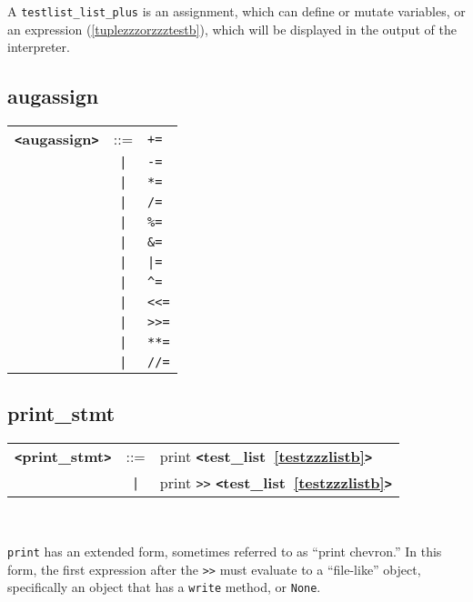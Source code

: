 \documentclass[12pt]{article}
\begin{document}
A \verb|testlist_list_plus| is an assignment, which can define or mutate variables, or an expression (\ref{tuplezzzorzzztestb}), which will be displayed in the output of the interpreter.

\subsection{augassign}
\label{augassignb}
\begin{tabular}{lcl}
{\bf \verb+<+augassign\verb+>+} & ::=  & \verb|+=| \\
 & \verb+|+  & \verb|-=| \\
 & \verb+|+  & \verb|*=| \\
 & \verb+|+  & \verb|/=| \\
 & \verb+|+  & \verb|%=| \\
 & \verb+|+  & \verb|&=| \\
 & \verb+|+  & \verb+|=+ \\
 & \verb+|+  & \verb|^=| \\
 & \verb+|+  & \verb|<<=| \\
 & \verb+|+  & \verb|>>=| \\
 & \verb+|+  & \verb|**=| \\
 & \verb+|+  & \verb|//=| \\
\end{tabular}

\subsection{print\_stmt}
\label{printzzzstmtb}
\begin{tabular}{lcl}
{\bf \verb+<+print\_stmt\verb+>+} & ::=  & print {\bf \verb+<+test\_list~\ref{testzzzlistb}\verb+>+}  \\
 & \verb+|+  & print \verb|>>| {\bf \verb+<+test\_list~\ref{testzzzlistb}\verb+>+}  \\
\end{tabular} \\


\verb|print| has an extended form, sometimes referred to as ``print chevron.'' 
In this form, the first expression after the \verb+>>+ must evaluate to a ``file-like'' 
object, specifically an object that has a \verb|write| method, or \verb|None|.
\end{document}
